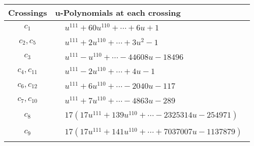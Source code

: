 \documentclass[1p]{elsarticle_modified}
\theoremstyle{definition}
\begin{document}
\begin{tabular}{m{50pt}|m{274pt}}
Crossings & \hspace{64pt}u-Polynomials at each crossing \\
\hline $$\begin{aligned}c_{1}\end{aligned}$$&$\begin{aligned}
&u^{111}+60 u^{110}+\cdots+6 u+1
\end{aligned}$\\
\hline $$\begin{aligned}c_{2},c_{5}\end{aligned}$$&$\begin{aligned}
&u^{111}+2 u^{110}+\cdots+3 u^2-1
\end{aligned}$\\
\hline $$\begin{aligned}c_{3}\end{aligned}$$&$\begin{aligned}
&u^{111}- u^{110}+\cdots-44608 u-18496
\end{aligned}$\\
\hline $$\begin{aligned}c_{4},c_{11}\end{aligned}$$&$\begin{aligned}
&u^{111}-2 u^{110}+\cdots+4 u-1
\end{aligned}$\\
\hline $$\begin{aligned}c_{6},c_{12}\end{aligned}$$&$\begin{aligned}
&u^{111}+6 u^{110}+\cdots-2040 u-117
\end{aligned}$\\
\hline $$\begin{aligned}c_{7},c_{10}\end{aligned}$$&$\begin{aligned}
&u^{111}+7 u^{110}+\cdots-4863 u-289
\end{aligned}$\\
\hline $$\begin{aligned}c_{8}\end{aligned}$$&$\begin{aligned}
&17(17 u^{111}+139 u^{110}+\cdots-2325314 u-254971)
\end{aligned}$\\
\hline $$\begin{aligned}c_{9}\end{aligned}$$&$\begin{aligned}
&17(17 u^{111}+141 u^{110}+\cdots+7037007 u-1137879)
\end{aligned}$\\
\hline
\end{tabular}\\~\\
\end{document}
